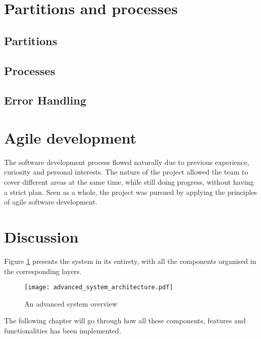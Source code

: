 \section{Partitions and processes}

\subsection{Partitions}

\subsection{Processes}

\subsection{Error Handling}

\section{Agile development}
The software development process flowed naturally due to previous 
experience, curiosity and personal interests. The nature of the project
allowed the team to cover different areas at the same time, while still
doing progress, without having a strict plan. Seen as a whole, the project
was pursued by applying the principles of agile software development.

\section{Discussion}

Figure \ref{fig:advanced_system} presents the system in its entirety,
with all the components organised in the corresponding layers.


\begin{figure}[H]
\centering
\texttt{[image: advanced\_system\_architecture.pdf]}

\caption{An advanced system overview}
\label{fig:advanced_system}
\end{figure}

The following chapter will go through how all these components,
features and functionalities has been implemented.

